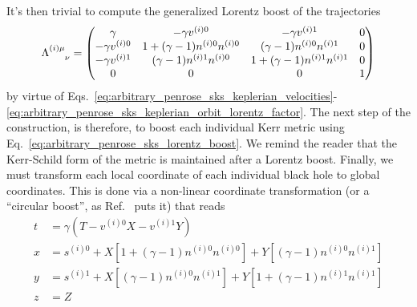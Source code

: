 %
It's then trivial to compute the generalized Lorentz boost of the trajectories
%
\begin{equation}
  \tens{\Lambda}{(i) \mu}{\nu} =
  \begin{pmatrix}
    \gamma            & -\gamma v^{(i) 0}              & -\gamma v^{(i) 1}              & 0 \\
    -\gamma v^{(i) 0} & 1+(\gamma-1) n^{(i)0} n^{(i)0} & (\gamma-1) n^{(i)0} n^{(i)1}   & 0 \\
    -\gamma v^{(i) 1} & (\gamma-1)n^{(i)1} n^{(i)0}    & 1+(\gamma-1) n^{(i)1} n^{(i)1} & 0 \\
    0                 & 0                              & 0                              & 1
  \end{pmatrix}
  \label{eq:arbitrary_penrose_sks_lorentz_boost}
\end{equation}
%
by virtue of Eqs.~\eqref{eq:arbitrary_penrose_sks_keplerian_velocities}-\eqref{eq:arbitrary_penrose_sks_keplerian_orbit_lorentz_factor}. The next step of the construction, is therefore, to boost each individual Kerr metric using Eq.~\eqref{eq:arbitrary_penrose_sks_lorentz_boost}. We remind the reader that the Kerr-Schild form of the metric is maintained after a Lorentz boost. Finally, we must transform each local coordinate of each individual black hole to global coordinates. This is done via a non-linear coordinate transformation (or a ``circular boost'', as Ref.~\cite{Armengol:2021shd} puts it) that reads
%
\begin{align}
  t & = \gamma \left( T - v^{(i) 0} X - v^{(i) 1} Y \right) \label{eq:arbitrary_penrose_sks_nonlinear_transformation_1}                                                                                          \\
  x & = s^{(i) 0} + X \left[ 1 + \left( \gamma - 1 \right) n^{(i) 0} n^{(i) 0}\right] + Y \left[\left( \gamma - 1 \right) n^{(i) 0} n^{(i) 1}\right] \label{eq:arbitrary_penrose_sks_nonlinear_transformation_2} \\
  y & = s^{(i) 1} + X \left[\left( \gamma - 1 \right) n^{(i) 0} n^{(i) 1}\right] + Y \left[1 + \left( \gamma - 1 \right) n^{(i) 1} n^{(i) 1}\right]  \label{eq:arbitrary_penrose_sks_nonlinear_transformation_3} \\
  z & = Z \label{eq:arbitrary_penrose_sks_nonlinear_transformation_4}
\end{align}

